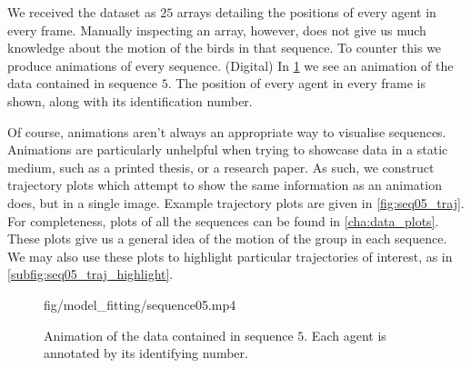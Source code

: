 We received the dataset as $25$ arrays detailing the positions of every agent in every frame. Manually inspecting an array, however, does not give us much knowledge about the motion of the birds in that sequence. To counter this we produce animations of every sequence. (Digital) In \cref{anim:sequence05} we see an animation of the data contained in sequence $5$. The position of every agent in every frame is shown, along with its identification number.

Of course, animations aren't always an appropriate way to visualise sequences. Animations are particularly unhelpful when trying to showcase data in a static medium, such as a printed thesis, or a research paper. As such, we construct trajectory plots which attempt to show the same information as an animation does, but in a single image. Example trajectory plots are given in \cref{fig:seq05_traj}. For completeness, plots of all the sequences can be found in \cref{cha:data_plots}. These plots give us a general idea of the motion of the group in each sequence. We may also use these plots to highlight particular trajectories of interest, as in \cref{subfig:seq05_traj_highlight}. 

\begin{figure}[!tbp]
	\centering
				 {\textwidth}{\textwidth}{fig/model_fitting/sequence05.mp4}
	\vspace{-190pt}
	\caption{Animation of the data contained in sequence $5$. Each agent is annotated by its identifying number.}
	\label{anim:sequence05}
\end{figure}

